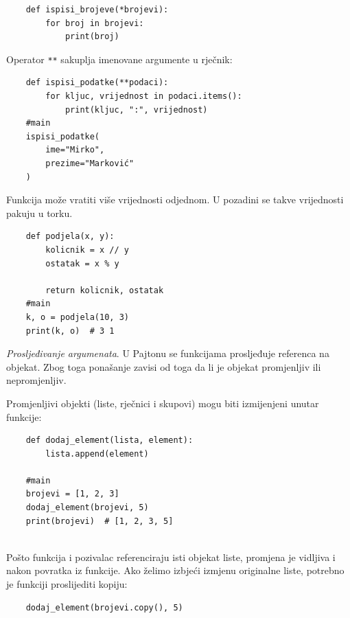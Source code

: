 \begin{verbatim}
	def ispisi_brojeve(*brojevi):
	    for broj in brojevi:
	        print(broj)
\end{verbatim}

Operator \texttt{**} sakuplja imenovane argumente u rječnik:

\begin{verbatim}
	def ispisi_podatke(**podaci):
	    for kljuc, vrijednost in podaci.items():
	        print(kljuc, ":", vrijednost)
	#main
	ispisi_podatke(
	    ime="Mirko",
	    prezime="Marković"
	)
\end{verbatim}


Funkcija može vratiti više vrijednosti odjednom. U pozadini se takve vrijednosti pakuju u torku.

\begin{verbatim}
	def podjela(x, y):
	    kolicnik = x // y
	    ostatak = x % y
	
	    return kolicnik, ostatak
	#main
	k, o = podjela(10, 3)
	print(k, o)  # 3 1
\end{verbatim}

\textit{Prosljeđivanje argumenata}.  U Pajtonu se funkcijama prosljeđuje referenca na objekat. Zbog toga ponašanje zavisi od toga da li je objekat promjenljiv ili nepromjenljiv.

Promjenljivi objekti (liste, rječnici i skupovi) mogu biti izmijenjeni unutar funkcije:

\begin{verbatim}
	def dodaj_element(lista, element):
	    lista.append(element)
	
	#main
	brojevi = [1, 2, 3]
	dodaj_element(brojevi, 5)
	print(brojevi)  # [1, 2, 3, 5]
	
\end{verbatim}

Pošto funkcija i pozivalac referenciraju isti objekat liste, promjena je vidljiva i nakon povratka iz funkcije. Ako želimo izbjeći izmjenu originalne liste, potrebno je funkciji proslijediti kopiju:

\begin{verbatim}
	dodaj_element(brojevi.copy(), 5)
\end{verbatim}


